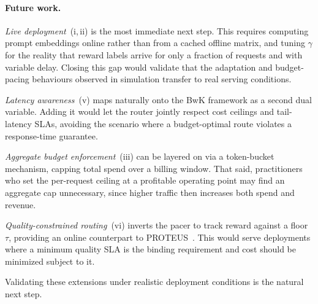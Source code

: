 \paragraph{Future work.}
\emph{Live deployment}~(i,\,ii) is the most immediate next step. This requires computing prompt embeddings online rather than from a cached offline matrix, and tuning $\gamma$ for the reality that reward labels arrive for only a fraction of requests and with variable delay. Closing this gap would validate that the adaptation and budget-pacing behaviours observed in simulation transfer to real serving conditions.

\emph{Latency awareness}~(v) maps naturally onto the BwK framework as a second dual variable. Adding it would let the router jointly respect cost ceilings and tail-latency SLAs, avoiding the scenario where a budget-optimal route violates a response-time guarantee.

\emph{Aggregate budget enforcement}~(iii) can be layered on via a token-bucket mechanism, capping total spend over a billing window. That said, practitioners who set the per-request ceiling at a profitable operating point may find an aggregate cap unnecessary, since higher traffic then increases both spend and revenue.

\emph{Quality-constrained routing}~(vi) inverts the pacer to track reward against a floor~$\tau$, providing an online counterpart to PROTEUS~\cite{bhatti2026proteus}. This would serve deployments where a minimum quality SLA is the binding requirement and cost should be minimized subject to it.

Validating these extensions under realistic deployment conditions is the natural next step.
